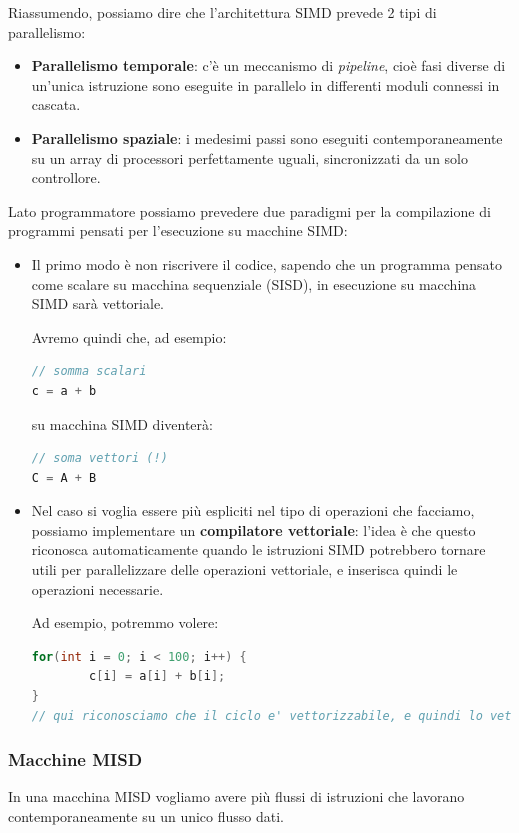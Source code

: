 \documentclass[a4paper,11pt]{article}
\begin{document}
Riassumendo, possiamo dire che l'architettura SIMD prevede 2 tipi di parallelismo:
\begin{itemize}
	\item \textbf{Parallelismo temporale}: c'è un meccanismo di \textit{pipeline}, cioè fasi diverse di un’unica istruzione sono eseguite in parallelo in differenti moduli connessi in cascata.
	\item \textbf{Parallelismo spaziale}: i medesimi passi sono eseguiti contemporaneamente su un array di processori perfettamente uguali, sincronizzati da un solo controllore.
\end{itemize}

\par\smallskip

Lato programmatore possiamo prevedere due paradigmi per la compilazione di programmi pensati per l'esecuzione su macchine SIMD:
\begin{itemize}
	\item Il primo modo è non riscrivere il codice, sapendo che un programma pensato come scalare su macchina sequenziale (SISD), in esecuzione su macchina SIMD sarà vettoriale.

Avremo quindi che, ad esempio:
\begin{lstlisting}[language=C++, style=codestyle]	
// somma scalari
c = a + b
\end{lstlisting}
su macchina SIMD diventerà:
\begin{lstlisting}[language=C++, style=codestyle]	
// soma vettori (!)
C = A + B
\end{lstlisting}

	\item Nel caso si voglia essere più espliciti nel tipo di operazioni che facciamo, possiamo implementare un \textbf{compilatore vettoriale}: l'idea è che questo riconosca automaticamente quando le istruzioni SIMD potrebbero tornare utili per parallelizzare delle operazioni vettoriale, e inserisca quindi le operazioni necessarie.

		Ad esempio, potremmo volere:
\begin{lstlisting}[language=C++, style=codestyle]	
for(int i = 0; i < 100; i++) {
		c[i] = a[i] + b[i];
}
// qui riconosciamo che il ciclo e' vettorizzabile, e quindi lo vettorizziamo
\end{lstlisting}
\end{itemize}

\subsubsection{Macchine MISD}
In una macchina MISD vogliamo avere più flussi di istruzioni che lavorano contemporaneamente su un unico flusso dati.
\end{document}
